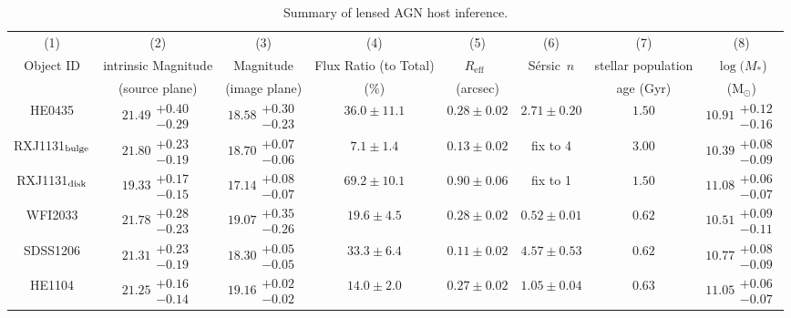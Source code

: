 \documentclass[fleqn,usenatbib]{mnras}
\newcommand{\sersic}{S\'ersic}
\newcommand{\reff}{{$R_{\mathrm{eff}}$}}
\begin{document}
\begin{table}
\renewcommand{\arraystretch}{1.25}
\centering
  \begin{threeparttable}
\caption{Summary of lensed AGN host inference.}\label{tab:host_measure}    
     \begin{tabular}{cccccccc}
\hline     
(1) & (2) & (3) & (4) & (5) & (6) & (7) & (8) \\    
Object ID & intrinsic Magnitude & Magnitude & Flux Ratio (to Total) & \reff\ & \sersic\ $n$ & stellar population & $\log (M_{*}$)  \\
 & (source plane) & (image plane) & ($\%$) & (arcsec) & & age (Gyr) & (M$_{\odot}$) \\ \hline
HE0435 & $21.49\substack{+0.40\\-0.29}$ & $18.58\substack{+0.30\\-0.23}$ & $36.0\pm11.1$ & $0.28\pm0.02$ & $2.71\pm0.20$ & $1.50$ & $10.91\substack{+0.12\\-0.16}$ \\
RXJ1131$_{\rm bulge}$ & $21.80\substack{+0.23\\-0.19}$ & $18.70\substack{+0.07\\-0.06}$ & $7.1\pm1.4$ & $0.13\pm0.02$ & fix to 4 & $3.00$ & $10.39\substack{+0.08\\-0.09}$ \\
RXJ1131$_{\rm disk}$ & $19.33\substack{+0.17\\-0.15}$ & $17.14\substack{+0.08\\-0.07}$ & $69.2\pm10.1$ & $0.90\pm0.06$ & fix to 1 & $1.50$ & $11.08\substack{+0.06\\-0.07}$ \\
WFI2033 & $21.78\substack{+0.28\\-0.23}$ & $19.07\substack{+0.35\\-0.26}$ & $19.6\pm4.5$ & $0.28\pm0.02$ & $0.52\pm0.01$ & $0.62$ & $10.51\substack{+0.09\\-0.11}$ \\
SDSS1206 & $21.31\substack{+0.23\\-0.19}$ & $18.30\substack{+0.05\\-0.05}$ & $33.3\pm6.4$ & $0.11\pm0.02$ & $4.57\pm0.53$ & $0.62$ & $10.77\substack{+0.08\\-0.09}$ \\
HE1104 & $21.25\substack{+0.16\\-0.14}$ & $19.16\substack{+0.02\\-0.02}$ & $14.0\pm2.0$ & $0.27\pm0.02$ & $1.05\pm0.04$ & $0.63$ & $11.05\substack{+0.06\\-0.07}$ \\

\end{tabular}
\end{threeparttable}
\end{table}
\end{document}
